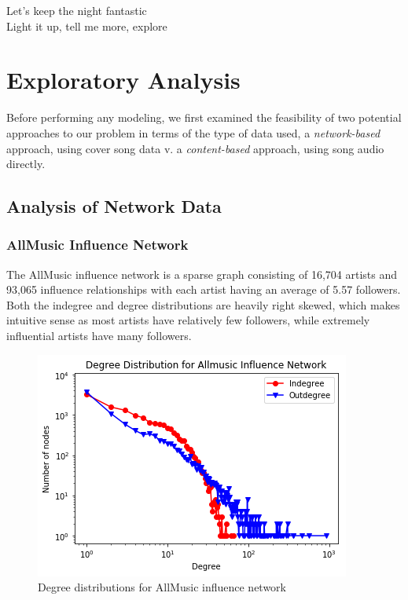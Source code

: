 \begin{savequote}[75mm] 
Let’s keep the night fantastic\\
Light it up, tell me more, explore
\end{savequote}

\chapter{Exploratory Analysis}
Before performing any modeling, we first examined the feasibility of two potential approaches to our problem in terms of the type of data used, a \textit{network-based} approach, using cover song data v. a \textit{content-based} approach, using song audio directly.

\section{Analysis of Network Data}
\subsection{AllMusic Influence Network}
The AllMusic influence network is a sparse graph consisting of 16,704 artists and 93,065 influence relationships with each artist having an average of 5.57 followers. Both the indegree and degree distributions are heavily right skewed, which makes intuitive sense as most artists have relatively few followers, while extremely influential artists have many followers.

\begin{figure}
\includegraphics[width=\textwidth]{figures/allmusic_degree_distribution.png}
\caption{Degree distributions for AllMusic influence network}
\end{figure}

